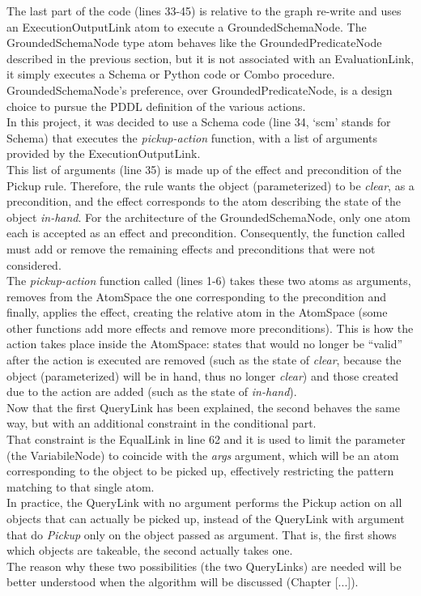 The last part of the code (lines 33-45) is relative to the graph re-write and uses an ExecutionOutputLink atom to execute a GroundedSchemaNode. The GroundedSchemaNode type atom behaves like the GroundedPredicateNode described in the previous section, but it is not associated with an EvaluationLink, it simply executes a Schema or Python code or Combo procedure. GroundedSchemaNode's preference, over GroundedPredicateNode, is a design choice to pursue the PDDL definition of the various actions. \\
In this project, it was decided to use a Schema code (line 34, `scm' stands for Schema) that executes the \textit{pickup-action} function, with a list of arguments provided by the ExecutionOutputLink. \\
This list of arguments (line 35) is made up of the effect and precondition of the Pickup rule. Therefore, the rule wants the object (parameterized) to be \textit{clear}, as a precondition, and the effect corresponds to the atom describing the state of the object \textit{in-hand}. 
For the architecture of the GroundedSchemaNode, only one atom each is accepted as an effect and precondition. Consequently, the function called must add or remove the remaining effects and preconditions that were not considered. \\
The \textit{pickup-action} function called (lines 1-6) takes these two atoms as arguments, removes from the AtomSpace the one corresponding to the precondition and finally, applies the effect, creating the relative atom in the AtomSpace (some other functions add more effects and remove more preconditions). This is how the action takes place inside the AtomSpace: states that would no longer be \enquote{valid} after the action is executed are removed (such as the state of \textit{clear}, because the object (parameterized) will be in hand, thus no longer \textit{clear}) and those created due to the action are added (such as the state of \textit{in-hand}). \\

Now that the first QueryLink has been explained, the second behaves the same way, but with an additional constraint in the conditional part. \\
That constraint is the EqualLink in line 62 and it is used to limit the parameter (the VariabileNode) to coincide with the \textit{args} argument, which will be an atom corresponding to the object to be picked up, effectively restricting the pattern matching to that single atom. \\
In practice, the QueryLink with no argument performs the Pickup action on all objects that can actually be picked up, instead of the QueryLink with argument that do \textit{Pickup} only on the object passed as argument. That is, the first shows which objects are takeable, the second actually takes one. \\
The reason why these two possibilities (the two QueryLinks) are needed will be better understood when the algorithm will be discussed (Chapter [...]). 

 